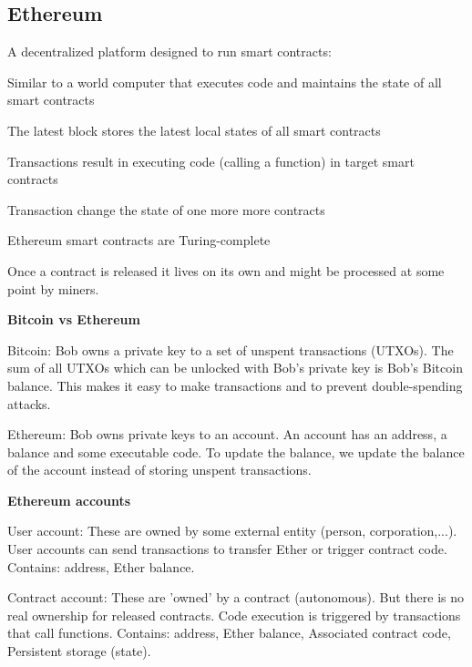 \documentclass[11pt,oneside,a4paper]{article}
\begin{document}
\subsection{Ethereum}

A decentralized platform designed to run smart contracts:

\begin{compactitem}
	\item Similar to a world computer that executes code and maintains the state of all smart contracts
	\item The latest block stores the latest local states of all smart contracts
	\item Transactions result in executing code (calling a function) in target smart contracts
	\item Transaction change the state of one more more contracts
	\item Ethereum smart contracts are Turing-complete
\end{compactitem}

Once a contract is released it lives on its own and might be processed at some point by miners.

\textbf{Bitcoin vs Ethereum}

\begin{compactitem}
	\item Bitcoin: Bob owns a private key to a set of unspent transactions (UTXOs). The sum of all UTXOs which can be unlocked with Bob's private key is Bob's Bitcoin balance. This makes it easy to make transactions and to prevent double-spending attacks.
	\item Ethereum: Bob owns private keys to an account. An account has an address, a balance and some executable code. To update the balance, we update the balance of the account instead of storing unspent
	transactions.
\end{compactitem}

\textbf{Ethereum accounts}

\begin{compactitem}
	\item User account: These are owned by some external entity (person, corporation,...). User accounts can send transactions to transfer Ether or trigger contract code. Contains: address, Ether balance.
	\item Contract account: These are 'owned' by a contract (autonomous). But there is no real ownership for released contracts. Code execution is triggered by transactions that call functions. Contains: address, Ether balance, Associated contract code, Persistent storage (state).\\
\end{compactitem}
\end{document}
